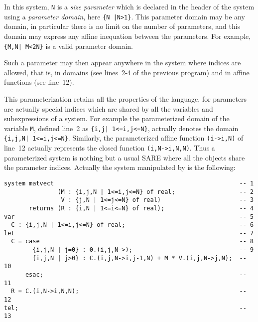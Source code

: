 In this system, \texttt{N} is a \emph{size parameter} which is declared in the header of the
system using  a \emph{parameter domain}, here \texttt{\{N |N>1\}}. This
parameter domain may be any {\alfa} domain, in particular there is no
limit on the number of parameters, and this domain may express any
affine inequation between the parameters. For example, \texttt{\{M,N|
M<2N\}} is a valid parameter domain.

Such a parameter may then appear anywhere in the system where indices
are allowed, that is, in domains (see lines~2-4 of
the previous program) and in affine functions (see line~12).

This parameterization retains all the properties of the language, for
parameters are actually special indices which are shared by all the
variables and subexpressions of a system. For example the
parameterized domain of the variable \texttt{M}, defined line~2 as
\texttt{\{i,j| 1<=i,j<=N\}}, actually denotes the domain
\texttt{\{i,j,N| 1<=i,j<=N\}}. Similarly, the parameterized affine
function \texttt{(i->i,N)} of line~12 actually represents the closed
function \texttt{(i,N->i,N,N)}. Thus a parameterized system is nothing
but a usual SARE where all the objects share the parameter
indices. Actually the system manipulated by {\mmalfa} is the
following:

\begin{verbatim}
system matvect                                                    -- 1  
               (M : {i,j,N | 1<=i,j<=N} of real;                  -- 2  
                V : {j,N | 1<=j<=N} of real)                      -- 3  
       returns (R : {i,N | 1<=i<=N} of real);                     -- 4  
var                                                               -- 5  
  C : {i,j,N | 1<=i,j<=N} of real;                                -- 6  
let                                                               -- 7  
  C = case                                                        -- 8  
        {i,j,N | j=0} : 0.(i,j,N->);                              -- 9  
        {i,j,N | j>0} : C.(i,j,N->i,j-1,N) + M * V.(i,j,N->j,N);  -- 10 
      esac;                                                       -- 11 
  R = C.(i,N->i,N,N);                                             -- 12 
tel;                                                              -- 13 
\end{verbatim}



